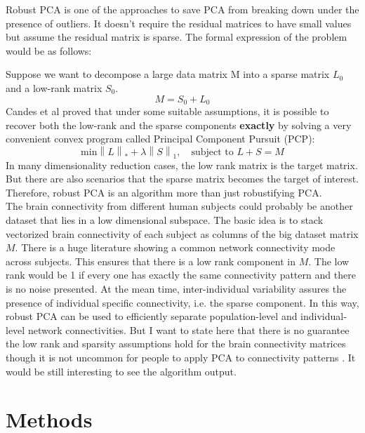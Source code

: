 \documentclass[12pt]{extarticle}
\newcommand{\<}{\langle}
\renewcommand{\>}{\rangle}
\theoremstyle{definition}
\newcommand{\norm}[1]{\left\lVert#1\right\rVert}
\begin{document}
Robust PCA is one of the approaches to save PCA from breaking down under the presence of outliers. It doesn't require the residual matrices to have small values but assume the residual matrix is sparse. The formal expression of the problem would be as follows: 

\noindent Suppose we want to decompose a large data matrix M into a sparse matrix $L_0$ and a low-rank matrix $S_0$.  
\begin{equation}
    M = S_0 + L_0
\end{equation}
Candes et al \cite{candes2011robust} proved that under some suitable assumptions, it is possible to recover both the low-rank and the sparse components \textbf{exactly} by solving a very convenient convex program called Principal Component Pursuit (PCP):
\begin{equation}
    \text{min} \norm{L}_* + \lambda \norm{S}_1, \quad\text{subject to } L+S = M
\end{equation}
In many dimensionality reduction cases, the low rank matrix is the target matrix. But there are also scenarios \cite{yatsenko2015improved} that the sparse matrix becomes the target of interest. Therefore, robust PCA is an algorithm more than just robustifying PCA. \\

The brain connectivity from different human subjects could probably be another dataset that lies in a low dimensional subspace. The basic idea is to stack vectorized brain connectivity of each subject as columns of the big dataset matrix $M$. There is a huge literature \cite{raichle2015brain} showing a common network connectivity mode across subjects. This ensures that there is a low rank component in $M$. The low rank would be 1 if every one has exactly the same connectivity pattern and there is no noise presented. At the mean time, inter-individual variability assures the presence of individual specific connectivity, i.e. the sparse component. In this way, robust PCA can be used to efficiently separate population-level and individual-level network connectivities. But I want to state here that there is no guarantee the low rank and sparsity assumptions hold for the brain connectivity matrices though it is not uncommon for people to apply PCA to connectivity patterns \cite{leonardi2013principal}. It would be still interesting to see the algorithm output.  


\section{Methods}
\end{document}
